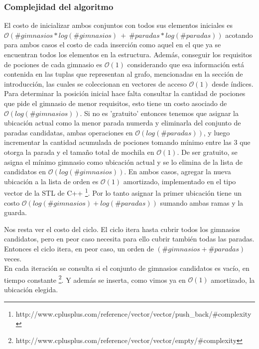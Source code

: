 \subsubsection{Complejidad del algoritmo}
    El costo de inicializar ambos conjuntos con todos sus elementos iniciales es $\mathcal{O}(\#gimnasios * log(\#gimnasios)\ +\ \#paradas*log(\#paradas))$ acotando para ambos casos el costo de cada inserción como aquel en el que ya se encuentran todos los elementos en la estructura. Además, conseguir los requisitos de pociones de cada gimnasio es $\mathcal{O}(1)$ considerando que esa información está contenida en las tuplas que representan al grafo, mencionadas en la sección de introducción, las cuales se coleccionan en vectores de acceso $\mathcal{O}(1)$ desde índices.
    \\

    Para determinar la posición inicial hace falta consultar la cantidad de pociones que pide el gimnasio de menor requisitos, esto tiene un costo asociado de $\mathcal{O}(log(\#gimnasios))$. Si no es 'gratuito' entonces tenemos que asignar la ubicación actual como la menor parada numerda y eliminarla del conjunto de paradas candidatas, ambas operaciones en $\mathcal{O}(log(\#paradas))$, y luego incrementar la cantidad acumulada de pociones tomando mínimo entre las 3 que otorga la parada y el tamaño total de mochila en $\mathcal{O}(1)$. De ser gratuito, se asigna el mínimo gimnasio como ubicación actual y se lo elimina de la lista de candidatos en $\mathcal{O}(log(\#gimnasios))$. En ambos casos, agregar la nueva ubicación a la lista de orden es $\mathcal{O}(1)$ amortizado, implementado en el tipo vector de la STL de C++ \footnote{http://www.cplusplus.com/reference/vector/vector/push_back/\#complexity}. Por lo tanto asignar la primer ubicación tiene un costo $\mathcal{O}(log(\#gimnasios)+log(\#paradas))$ sumando ambas ramas y la guarda.
    \newpage

    Nos resta ver el costo del ciclo. El ciclo itera hasta cubrir todos los gimnasios candidatos, pero en peor caso necesita para ello cubrir también todas las paradas. Entonces el ciclo itera, en peor caso, un orden de $(\#gimnasios+\#paradas)$ veces.
    \\

    En cada iteración se consulta si el conjunto de gimnasios candidatos es vacío, en tiempo constante \footnote{http://www.cplusplus.com/reference/vector/vector/empty/\#complexity}. Y además se inserta, como vimos ya en $\mathcal{O}(1)$ amortizado, la ubicación elegida.
    \\

